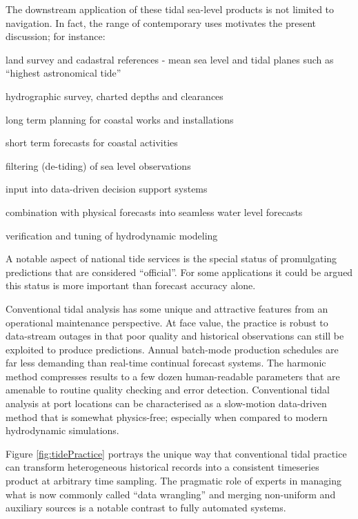 The downstream application of these tidal sea-level products is not limited to navigation.   
In fact, the range of contemporary uses motivates the present discussion; for instance:
\begin{inparaenum}[1)]
    \item land survey and cadastral references - mean sea level and tidal planes such as ``highest astronomical tide'' 
    \item hydrographic survey, charted depths and clearances
    \item long term planning for coastal works and installations
    \item short term forecasts for coastal activities 
    \item filtering (de-tiding) of sea level observations
    \item input into data-driven decision support systems
    \item combination with physical forecasts into seamless water level forecasts 
    \item verification and tuning of hydrodynamic modeling
\end{inparaenum}

A notable aspect of national tide services is the special status of promulgating predictions that are considered ``official''.   For some applications it could be argued this status is more important than forecast accuracy alone.
  
  

Conventional tidal analysis has some unique and attractive features from an operational maintenance perspective.
At face value, the practice is robust to data-stream outages in that poor quality and historical observations can still be exploited to produce predictions.  
Annual batch-mode production schedules are far less demanding than real-time continual forecast systems. 
The harmonic method compresses results to a few dozen  human-readable parameters that are amenable to routine quality checking and error detection. 
Conventional tidal analysis at port locations can be characterised as a slow-motion data-driven method that is somewhat physics-free; especially when compared to modern hydrodynamic simulations. 

Figure \ref{fig:tidePractice} portrays the unique way that conventional tidal practice can transform heterogeneous historical records into a consistent timeseries product at arbitrary time sampling.
The pragmatic role of experts in managing what is now commonly  called ``data wrangling'' and merging non-uniform and auxiliary sources is a notable contrast to fully automated systems.
 
